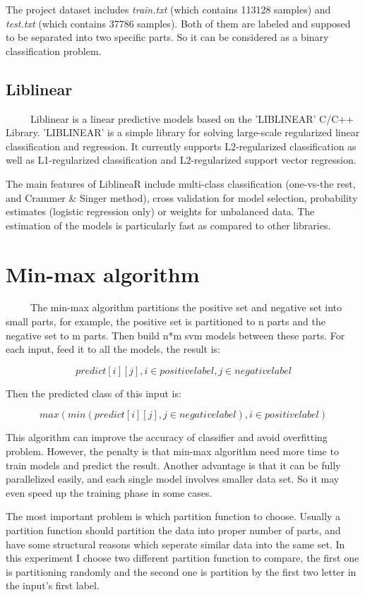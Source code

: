 \documentclass[11pt]{article}
\begin{document}
The project dataset includes \emph{train.txt} (which contains 113128 samples) and \emph{test.txt} (which contains 37786 samples). Both of them are labeled and supposed to be separated into two specific parts. So it can be considered as a binary classification problem.

\subsection{Liblinear}
\label{sec-1-2}

\ \ \ \ \ Liblinear is a linear predictive models based on the 'LIBLINEAR' C/C++ Library. 'LIBLINEAR' is a simple library for solving large-scale regularized linear classification and regression. It currently supports L2-regularized classification as well as L1-regularized classification and L2-regularized support vector regression.

The main features of LiblineaR include multi-class classification (one-vs-the rest, and Crammer \& Singer method), cross validation for model selection, probability estimates (logistic regression only) or weights for unbalanced data. The estimation of the models is particularly fast as compared to other libraries.


\section{Min-max algorithm}
\label{sec-2}
\ \ \ \ \ The min-max algorithm partitions the positive set and negative set into
small parts, for example, the positive set is partitioned to n parts and
the negative set to m parts. Then build n*m svm models between these parts.
For each input, feed it to all the models, the result is:

$$ predict[i][j], i \in positive label, j \in negative label$$

Then the predicted class of this input is:

$$ max(min(predict[i][j], j \in negative label), i \in positive label)$$

This algorithm can improve the accuracy of classifier and avoid overfitting problem.
However, the penalty is that min-max algorithm need more time to train models and predict
the result. Another advantage is that it can be fully parallelized easily, and each single model
involves smaller data set. So it may even speed up the training phase in some cases.

The most important problem is which partition function to choose. Usually a partition function
should partition the data into proper number of parts, and have some structural reasons which
seperate similar data into the same set. In this experiment I choose two different partition function
to compare, the first one is partitioning randomly and the second one is partition by the first two
letter in the input's first label.
\end{document}
